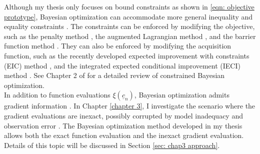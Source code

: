 Although my thesis only focuses on bound constraints as shown in \eqref{eqn: objective prototype}, 
Bayesian optimization can accommodate more general inequality and equality 
constraints \cite{PhD review constraint}. The constraints can be enforced by modifying the objective, such as
the penalty method \cite{penalty method}, the augmented Lagrangian method
\cite{augmented lagrangian method}, and the barrier function method \cite{barrier method}.
They can also be enforced by modifying the acquisition function, such as the
recently developed expected improvement with constraints (EIC) method \cite{EIC},
and the integrated expected conditional improvement (IECI) method \cite{IECI}.
See Chapter 2 of \cite{PhD review constraint} 
for a detailed review of constrained Bayesian optimization.\\

In addition to function evaluations $\xi(\underline{c}_n)$, Bayesian optimization
admits gradient information \cite{derivative RKHS, grad coKriging}. In Chapter \ref{chapter 3},
I investigate the scenario where the gradient
evaluations are inexact, possibly corrupted by model inadequacy and observation error
\cite{KennedyOhagan2}.
The Bayesian optimization method developed in my thesis 
allows both the exact function evaluation and the inexact gradient evaluation.
Details of this topic will be discussed in Section
\ref{sec: chap3 approach}.


